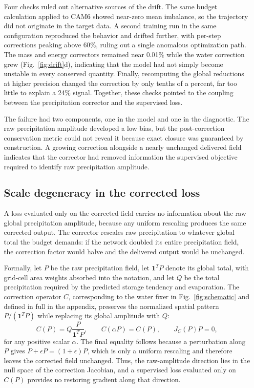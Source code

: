 \documentclass{ametsocV6.1}
\begin{document}
Four checks ruled out alternative sources of the drift. The same budget calculation applied to CAM6 showed near-zero mean imbalance, so the trajectory did not originate in the target data. A second training run in the same configuration reproduced the behavior and drifted further, with per-step corrections peaking above 60\%, ruling out a single anomalous optimization path. The mass and energy correctors remained near 0.01\% while the water correction grew (Fig.~\ref{fig:drift}d), indicating that the model had not simply become unstable in every conserved quantity. Finally, recomputing the global reductions at higher precision changed the correction by only tenths of a percent, far too little to explain a 24\% signal. Together, these checks pointed to the coupling between the precipitation corrector and the supervised loss.

The failure had two components, one in the model and one in the diagnostic. The raw precipitation amplitude developed a low bias, but the post-correction conservation metric could not reveal it because exact closure was guaranteed by construction. A growing correction alongside a nearly unchanged delivered field indicates that the corrector had removed information the supervised objective required to identify raw precipitation amplitude.

\subsection{Scale degeneracy in the corrected loss}\label{sec:mechanism}

A loss evaluated only on the corrected field carries no information about the raw global precipitation amplitude, because any uniform rescaling produces the same corrected output. The corrector rescales raw precipitation to whatever global total the budget demands: if the network doubled its entire precipitation field, the correction factor would halve and the delivered output would be unchanged.

Formally, let $P$ be the raw precipitation field, let $\mathbf{1}^{T}P$ denote its global total, with grid-cell area weights absorbed into the notation, and let $Q$ be the total precipitation required by the predicted storage tendency and evaporation. The correction operator $C$, corresponding to the water fixer in Fig.~\ref{fig:schematic} and defined in full in the appendix, preserves the normalized spatial pattern $P/(\mathbf{1}^{T}P)$ while replacing its global amplitude with $Q$:
\begin{equation}
C(P)
=
Q\frac{P}{\mathbf{1}^{T}P},
\qquad
C(\alpha P)
=
C(P),
\qquad
J_C(P)P
=
0,
\label{eq:null}
\end{equation}
for any positive scalar $\alpha$. The final equality follows because a perturbation along $P$ gives $P+\epsilon P=(1+\epsilon)P$, which is only a uniform rescaling and therefore leaves the corrected field unchanged. Thus, the raw-amplitude direction lies in the null space of the correction Jacobian, and a supervised loss evaluated only on $C(P)$ provides no restoring gradient along that direction.
\end{document}
